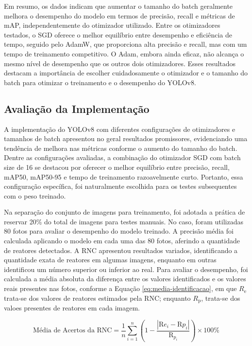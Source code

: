 Em resumo, os dados indicam que aumentar o tamanho do batch geralmente melhora o desempenho do modelo em termos de precisão, recall e métricas de mAP, independentemente do otimizador utilizado. Entre os otimizadores testados, o SGD oferece o melhor equilíbrio entre desempenho e eficiência de tempo, seguido pelo AdamW, que proporciona alta precisão e recall, mas com um tempo de treinamento competitivo. O Adam, embora ainda eficaz, não alcança o mesmo nível de desempenho que os outros dois otimizadores. Esses resultados destacam a importância de escolher cuidadosamente o otimizador e o tamanho do batch para otimizar o treinamento e o desempenho do YOLOv8.

\subsection{Avaliação da Implementação}

A implementação do YOLOv8 com diferentes configurações de otimizadores e tamanhos de batch apresentou no geral resultados promissores, evidenciando uma tendência de melhora nas métricas conforme o aumento do tamanho do batch. Dentre as configurações avaliadas, a combinação do otimizador SGD com batch size de 16 se destacou por oferecer o melhor equilíbrio entre precisão, recall, mAP50, mAP50-95 e tempo de treinamento razoavelmente curto. Portanto, essa configuração específica, foi naturalmente escolhida para os testes subsequentes com o peso treinado.

Na separação do conjunto de imagens para treinamento, foi adotada a prática de reservar 20\% do total de imagens para testes manuais. No caso, foram utilizadas 80 fotos para avaliar o desempenho do modelo treinado. A precisão média foi calculada aplicando o modelo em cada uma das 80 fotos, aferindo a quantidade de reatores detectados. A RNC apresentou resultados variados, identificando a quantidade exata de reatores em algumas imagens, enquanto em outras identificou um número superior ou inferior ao real. Para avaliar o desempenho, foi calculada a média absoluta da diferença entre os valores identificados e os valores reais presentes nas fotos, conforme a Equação \eqref{eq:media-identificacao}, em que \( R_{\text{e}} \) trata-se dos valores de reatores estimados pela RNC; enquanto \( R_{\text{p}} \), trata-se dos valoes presentes de reatores em cada imagem.

\begin{equation} \text{Média de Acertos da RNC} = \frac{1}{n} \sum_{i=1}^{n} \left(1 - \frac{|\text{R}{e_i} - \text{R}{p_i}|}{\text{R}_{p_i}}\right) \times 100\% \label{eq:media-identificacao} \end{equation}

